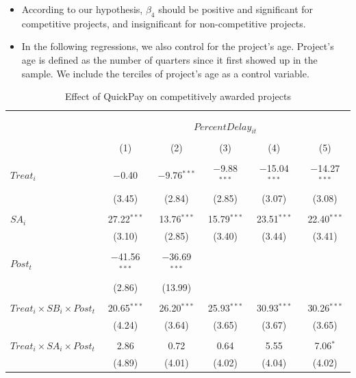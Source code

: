\documentclass[
]{article}
\begin{document}
\begin{itemize}
\item
  According to our hypothesis, \(\beta_4\) should be positive and
  significant for competitive projects, and insignificant for
  non-competitive projects.
\item
  In the following regressions, we also control for the project's age.
  Project's age is defined as the number of quarters since it first
  showed up in the sample. We include the terciles of project's age as a
  control variable.
\end{itemize}

\begin{table}[H] \centering 
  \caption{Effect of QuickPay on competitively awarded projects} 
  \label{} 
\small 
\begin{tabular}{@{\extracolsep{-2pt}}lccccc} 
\\[-1.8ex]\hline 
\hline \\[-1.8ex] 
\\[-1.8ex] & \multicolumn{5}{c}{$PercentDelay_{it}$  } \\ 
\\[-1.8ex] & (1) & (2) & (3) & (4) & (5)\\ 
\hline \\[-1.8ex] 
 $Treat_i$ & $-$0.40 & $-$9.76$^{***}$ & $-$9.88$^{***}$ & $-$15.04$^{***}$ & $-$14.27$^{***}$ \\ 
  & (3.45) & (2.84) & (2.85) & (3.07) & (3.08) \\ 
  & & & & & \\ 
 $SA_i$ & 27.22$^{***}$ & 13.76$^{***}$ & 15.79$^{***}$ & 23.51$^{***}$ & 22.40$^{***}$ \\ 
  & (3.10) & (2.85) & (3.40) & (3.44) & (3.41) \\ 
  & & & & & \\ 
 $Post_t$ & $-$41.56$^{***}$ & $-$36.69$^{***}$ &  &  &  \\ 
  & (2.86) & (13.99) &  &  &  \\ 
  & & & & & \\ 
 $Treat_i \times SB_i \times Post_t$ & 20.65$^{***}$ & 26.20$^{***}$ & 25.93$^{***}$ & 30.93$^{***}$ & 30.26$^{***}$ \\ 
  & (4.24) & (3.64) & (3.65) & (3.67) & (3.65) \\ 
  & & & & & \\ 
 $Treat_i \times SA_i \times Post_t$ & 2.86 & 0.72 & 0.64 & 5.55 & 7.06$^{*}$ \\ 
  & (4.89) & (4.01) & (4.02) & (4.04) & (4.02) \\ 

\end{tabular}
\end{table}
\end{document}
